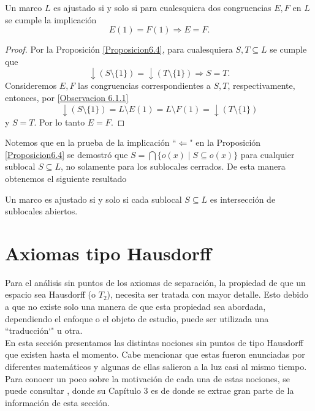 \documentclass{comunicaciones}
\begin{document}
\begin{thm}\label{Teorema6.5}
    Un marco $L$ es ajustado si y solo si para cualesquiera dos congruencias $E, F$ en $L$ se cumple la implicación
    \[
    E(1)=F(1)\Rightarrow E=F.
    \]

    \begin{proof}
        Por la Proposición \ref{Proposicion6.4}, para cualesquiera $S, T\subseteq L$ se cumple que 
        \[
        \downarrow(S\setminus \{1\})=\downarrow(T\setminus \{1\})\Rightarrow S=T.
        \]
        Consideremos $E, F$ las congruencias correspondientes a $S, T$, respectivamente, entonces, por \ref{Observacion 6.1.1}
        \[
        \downarrow (S\setminus \{1\})=L\setminus E(1)=L\setminus F(1)=\downarrow (T\setminus \{1\})
        \]
        y $S=T$. Por lo tanto $E=F$.
    \end{proof}
\end{thm}


Notemos que en la prueba de la implicación ``$\Leftarrow$" en la Proposición \ref{Proposicion6.4} se demostró que $S=\bigcap\{o(x)\mid S\subseteq o(x)\}$ para cualquier sublocal $S\subseteq L$, no solamente para los sublocales cerrados. De esta manera obtenemos el siguiente resultado

\begin{thm}
    Un marco es ajustado si y solo si cada sublocal $S\subseteq L$ es intersección de sublocales abiertos.
\end{thm}


\section{Axiomas tipo Hausdorff}

Para el análisis sin puntos de los axiomas de separación, la propiedad de que un espacio sea Hausdorff (o $T_2$), necesita ser tratada con mayor detalle. Esto debido a que no existe solo una manera de que esta propiedad sea abordada, dependiendo el enfoque o el objeto de estudio, puede ser utilizada una ``traducción`" u otra.\\

En esta sección presentamos las distintas nociones sin puntos de tipo Hausdorff que existen hasta el momento. Cabe mencionar que estas fueron enunciadas por diferentes matemáticos y algunas de ellas salieron a la luz casi al mismo tiempo. Para conocer un poco sobre la motivación de cada una de estas nociones, se puede consultar \cite{J.P.2}, donde su Capítulo 3 es de donde se extrae gran parte de la información de esta sección.\\
\end{document}
